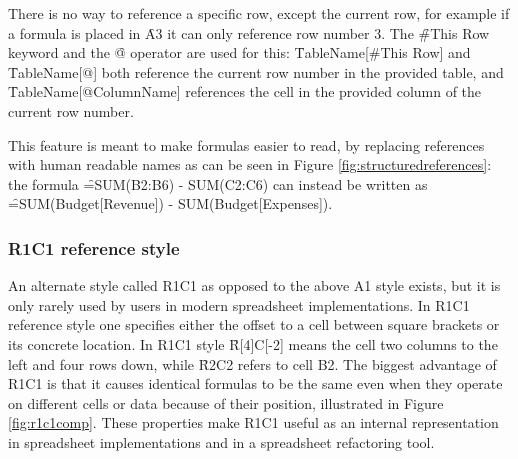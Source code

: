There is no way to reference a specific row, except the current row, for example if a formula is placed in \f{A3} it can only reference row number 3.
The \f{\#This Row} keyword and the \f{@} operator are used for this: \f{TableName[\#This Row]} and \f{TableName[@]} both reference the current row number in the provided table, and \f{TableName[@ColumnName]} references the cell in the provided column of the current row number.

This feature is meant to make formulas easier to read, by replacing references with human readable names as can be seen in Figure \ref{fig:structuredreferences}: the formula \f{=SUM(B2:B6) - SUM(C2:C6)} can instead be written as \f{=SUM(Budget[Revenue]) - SUM(Budget[Expenses])}.

\subsubsection{R1C1 reference style}

An alternate style called R1C1 as opposed to the above A1 style exists, but it is only rarely used by users in modern spreadsheet implementations.
In R1C1 reference style one specifies either the offset to a cell between square brackets or its concrete location.
In R1C1 style \f{R[4]C[-2]} means the cell two columns to the left and four rows down, while \f{R2C2} refers to cell B2.
The biggest advantage of R1C1 is that it causes identical formulas to be the same even when they operate on different cells or data because of their position, illustrated in Figure \ref{fig:r1c1comp}.
These properties make R1C1 useful as an internal representation in spreadsheet implementations and in a spreadsheet refactoring tool.

